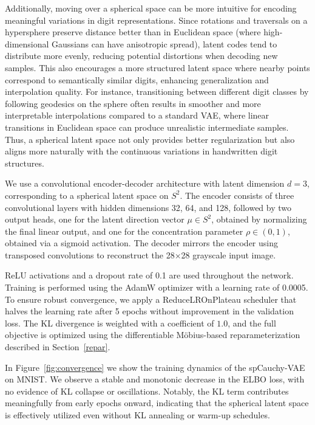\documentclass{article}
\begin{document}
Additionally, moving over a spherical space can be more intuitive for encoding meaningful variations in digit representations. Since rotations and traversals on a hypersphere preserve distance better than in Euclidean space (where high-dimensional Gaussians can have anisotropic spread), latent codes tend to distribute more evenly, reducing potential distortions when decoding new samples. This also encourages a more structured latent space where nearby points correspond to semantically similar digits, enhancing generalization and interpolation quality. For instance, transitioning between different digit classes by following geodesics on the sphere often results in smoother and more interpretable interpolations compared to a standard VAE, where linear transitions in Euclidean space can produce unrealistic intermediate samples. Thus, a spherical latent space not only provides better regularization but also aligns more naturally with the continuous variations in handwritten digit structures.


We use a convolutional encoder-decoder architecture with latent dimension \( d = 3 \), corresponding to a spherical latent space on \( S^2 \). The encoder consists of three convolutional layers with hidden dimensions 32, 64, and 128, followed by two output heads, one for the latent direction vector \( \mu \in S^2 \), obtained by normalizing the final linear output, and one for the concentration parameter \( \rho \in (0,1) \), obtained via a sigmoid activation. The decoder mirrors the encoder using transposed convolutions to reconstruct the 28×28 grayscale input image.

ReLU activations and a dropout rate of 0.1 are used throughout the network. Training is performed using the AdamW optimizer with a learning rate of 0.0005. To ensure robust convergence, we apply a ReduceLROnPlateau scheduler that halves the learning rate after 5 epochs without improvement in the validation loss. The KL divergence is weighted with a coefficient of $1.0$, and the full objective is optimized using the differentiable Möbius-based reparameterization described in Section~\ref{repar}.

In Figure~\ref{fig:convergence} we show the training dynamics of the spCauchy-VAE on MNIST. We observe a stable and monotonic decrease in the ELBO loss, with no evidence of KL collapse or oscillations. Notably, the KL term contributes meaningfully from early epochs onward, indicating that the spherical latent space is effectively utilized even without KL annealing or warm-up schedules.
\end{document}
